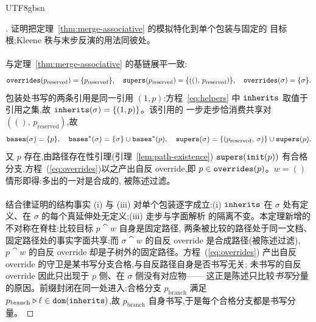 \begin{CJK*}{UTF8}{gbsn}


\begin{proof}[]
\ifPaperChinese
  证明把定理~\ref{thm:merge-associative} 的模拟特化到单个包装与固定的
  目标根;Kleene 秩与末步反演的用法同彼处。

  \paragraph{}
  与定理~\ref{thm:merge-associative} 的基链展平一致:
  \[
    \mathtt{overrides}(p_{\mathrm{reserved}}) = \{p_{\mathrm{reserved}}\},
    \quad
    \mathtt{supers}(p_{\mathrm{reserved}}) = \{((),\, p_{\mathrm{reserved}})\},
    \quad
    \mathtt{overrides}(\sigma) = \{\sigma\}.
  \]
  包装处书写的两条引用是同一引用 $(1, p)$:方程~\eqref{eq:helpers} 中
  $\mathtt{inherits}$ 取值于引用之集,故 $\mathtt{inherits}(\sigma) = \{(1, p)\}$。该引用的
  一步走步恰消费共享对 $((),\, p_{\mathrm{reserved}})$,故
  \[
    \mathtt{bases}(\sigma) = \{p\},
    \quad
    \mathtt{bases}^*(\sigma) = \{\sigma\} \cup \mathtt{bases}^*(p),
    \quad
    \mathtt{supers}(\sigma) = \{(p_{\mathrm{reserved}},\, \sigma)\} \cup \mathtt{supers}(p).
  \]
  又 $p$ 存在,由路径存在性引理(引理~\ref{lem:path-existence})
  $\mathtt{supers}(\mathtt{init}(p))$ 有合格分支,方程~(\ref{eq:overrides})以之产出自反
  override,即 $p \in \mathtt{overrides}(p)$。$w = ()$ 情形即得:多出的一对是合成的,
  被陈述过滤。

  \paragraph{}
  结合律证明的结构事实 (i) 与 (iii) 对单个包装逐字成立:(i) $\mathtt{inherits}$ 在
  $\sigma$ 处有定义、在 $\sigma$ 的每个真延伸处无定义;(iii) 走步与字面解析
  的隔离不变。本定理新增的不对称在脊柱:比较目标 $p \cat w$ 自身是固定路径,
  两条被比较的路径处于同一文档、固定路径处的事实字面共享;而
  $\sigma \cat w$ 的自反 override 是合成路径(被陈述过滤),
  $p \cat w$ 的自反 override 却是子树外的固定路径。方程~(\ref{eq:overrides})
  产出自反 override 的守卫是某书写分支合格,与自反路径自身是否书写无关;
  未书写的自反 override 因此只出现于 $p$ 侧、在 $\sigma$ 侧没有对应物——
  这正是陈述只比较\emph{书写}分量的原因。前缀封闭在同一处进入:合格分支
  $p_{\mathrm{branch}}$ 满足
  $p_{\mathrm{branch}} \mathbin{\triangleright} \ell \in \mathtt{dom}(\mathtt{inherits})$,故
  $p_{\mathrm{branch}}$ 自身书写,于是每个合格分支都是书写分量。


\end{proof}
\end{CJK*}
